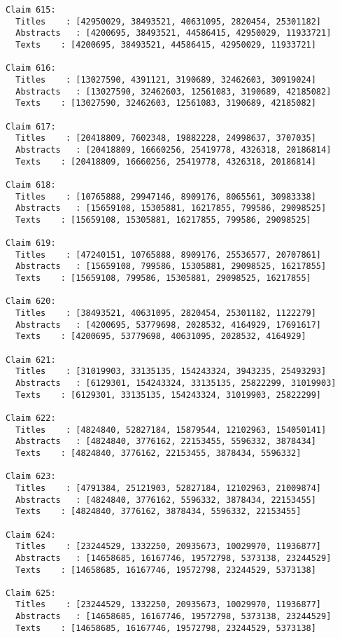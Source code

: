 \documentclass[11pt]{article}
\begin{document}
\begin{Verbatim}[commandchars=\\\{\}]
Claim 615:
  Titles    : [42950029, 38493521, 40631095, 2820454, 25301182]
  Abstracts   : [4200695, 38493521, 44586415, 42950029, 11933721]
  Texts    : [4200695, 38493521, 44586415, 42950029, 11933721]

Claim 616:
  Titles    : [13027590, 4391121, 3190689, 32462603, 30919024]
  Abstracts   : [13027590, 32462603, 12561083, 3190689, 42185082]
  Texts    : [13027590, 32462603, 12561083, 3190689, 42185082]

Claim 617:
  Titles    : [20418809, 7602348, 19882228, 24998637, 3707035]
  Abstracts   : [20418809, 16660256, 25419778, 4326318, 20186814]
  Texts    : [20418809, 16660256, 25419778, 4326318, 20186814]

Claim 618:
  Titles    : [10765888, 29947146, 8909176, 8065561, 30983338]
  Abstracts   : [15659108, 15305881, 16217855, 799586, 29098525]
  Texts    : [15659108, 15305881, 16217855, 799586, 29098525]

Claim 619:
  Titles    : [47240151, 10765888, 8909176, 25536577, 20707861]
  Abstracts   : [15659108, 799586, 15305881, 29098525, 16217855]
  Texts    : [15659108, 799586, 15305881, 29098525, 16217855]

Claim 620:
  Titles    : [38493521, 40631095, 2820454, 25301182, 1122279]
  Abstracts   : [4200695, 53779698, 2028532, 4164929, 17691617]
  Texts    : [4200695, 53779698, 40631095, 2028532, 4164929]

Claim 621:
  Titles    : [31019903, 33135135, 154243324, 3943235, 25493293]
  Abstracts   : [6129301, 154243324, 33135135, 25822299, 31019903]
  Texts    : [6129301, 33135135, 154243324, 31019903, 25822299]

Claim 622:
  Titles    : [4824840, 52827184, 15879544, 12102963, 154050141]
  Abstracts   : [4824840, 3776162, 22153455, 5596332, 3878434]
  Texts    : [4824840, 3776162, 22153455, 3878434, 5596332]

Claim 623:
  Titles    : [4791384, 25121903, 52827184, 12102963, 21009874]
  Abstracts   : [4824840, 3776162, 5596332, 3878434, 22153455]
  Texts    : [4824840, 3776162, 3878434, 5596332, 22153455]

Claim 624:
  Titles    : [23244529, 1332250, 20935673, 10029970, 11936877]
  Abstracts   : [14658685, 16167746, 19572798, 5373138, 23244529]
  Texts    : [14658685, 16167746, 19572798, 23244529, 5373138]

Claim 625:
  Titles    : [23244529, 1332250, 20935673, 10029970, 11936877]
  Abstracts   : [14658685, 16167746, 19572798, 5373138, 23244529]
  Texts    : [14658685, 16167746, 19572798, 23244529, 5373138]


\end{Verbatim}
\end{document}
